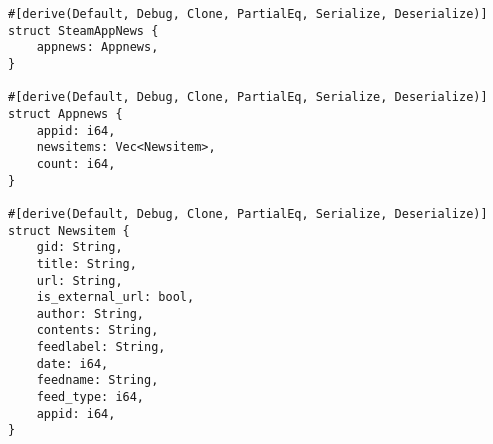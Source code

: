 \begin{multicols}{2}
\begin{verbatim}
#[derive(Default, Debug, Clone, PartialEq, Serialize, Deserialize)]
struct SteamAppNews {
    appnews: Appnews,
}

#[derive(Default, Debug, Clone, PartialEq, Serialize, Deserialize)]
struct Appnews {
    appid: i64,
    newsitems: Vec<Newsitem>,
    count: i64,
}

#[derive(Default, Debug, Clone, PartialEq, Serialize, Deserialize)]
struct Newsitem {
    gid: String,
    title: String,
    url: String,
    is_external_url: bool,
    author: String,
    contents: String,
    feedlabel: String,
    date: i64,
    feedname: String,
    feed_type: i64,
    appid: i64,
}
\end{verbatim}
\end{multicols}
